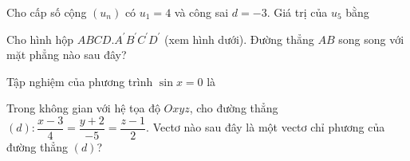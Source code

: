 \documentclass{exam}
\begin{document}
\begin{question}
Cho cấp số cộng $\left(u_n\right)$ có $u_1=4$ và công sai $d=-3$. Giá trị của $u_5$ bằng






\end{question}





\begin{question}
Cho hình hộp $ABCD.A^{\prime}B^{\prime}C^{\prime}D^{\prime}$ (xem hình dưới). Đường thẳng $AB$ song song với mặt phẳng nào sau đây?

\begin{center}\end{center}






\end{question}





\begin{question}
Tập nghiệm của phương trình $\sin x=0$ là






\end{question}





\begin{question}
Trong không gian với hệ tọa độ $Oxyz$, cho đường thẳng $(d): \dfrac{x-3}{4}=\dfrac{y+2}{-5}=\dfrac{z-1}{2}$. Vectơ nào sau đây là một vectơ chỉ phương của đường thẳng $(d)$?






\end{question}
\end{document}
